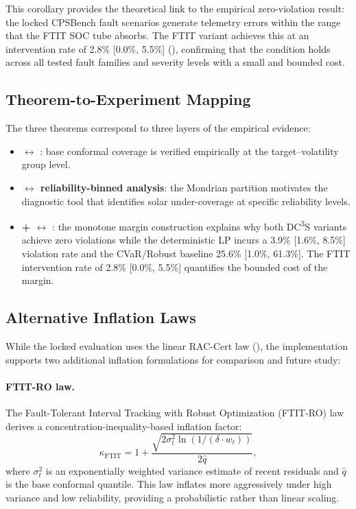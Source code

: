 \documentclass[11pt,a4paper]{article}
\begin{document}
This corollary provides the theoretical link to the empirical zero-violation result: the locked CPSBench fault scenarios generate telemetry errors within the range that the FTIT SOC tube absorbs. The FTIT variant achieves this at an intervention rate of 2.8\% [0.0\%, 5.5\%] (), confirming that the condition holds across all tested fault families and severity levels with a small and bounded cost.

\subsection{Theorem-to-Experiment Mapping}

The three theorems correspond to three layers of the empirical evidence:
\begin{itemize}[leftmargin=*,topsep=2pt,itemsep=1pt]
  \item \textbf{ $\leftrightarrow$ }: base conformal coverage is verified empirically at the target--volatility group level.
  \item \textbf{ $\leftrightarrow$ reliability-binned analysis}: the Mondrian partition motivates the diagnostic tool that identifies solar under-coverage at specific reliability levels.
  \item \textbf{ +  $\leftrightarrow$ }: the monotone margin construction explains why both DC\textsuperscript{3}S variants achieve zero violations while the deterministic LP incurs a 3.9\% [1.6\%, 8.5\%] violation rate and the CVaR/Robust baseline 25.6\% [1.0\%, 61.3\%]. The FTIT intervention rate of 2.8\% [0.0\%, 5.5\%] quantifies the bounded cost of the margin.
\end{itemize}

\subsection{Alternative Inflation Laws}

While the locked evaluation uses the linear RAC-Cert law (), the implementation supports two additional inflation formulations for comparison and future study:

\paragraph{FTIT-RO law.} The Fault-Tolerant Interval Tracking with Robust Optimization (FTIT-RO) law derives a concentration-inequality-based inflation factor:
\begin{equation}\label{eq:ftit_inflation}
  \kappa_{\text{FTIT}} = 1 + \frac{\sqrt{2\sigma^2_t \ln(1/(\delta \cdot w_t))}}{2\hat{q}},
\end{equation}
where $\sigma^2_t$ is an exponentially weighted variance estimate of recent residuals and $\hat{q}$ is the base conformal quantile. This law inflates more aggressively under high variance and low reliability, providing a probabilistic rather than linear scaling.
\end{document}
